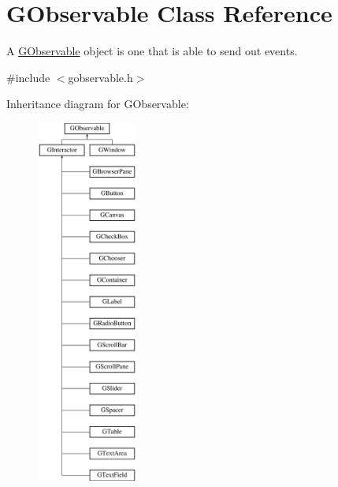 \hypertarget{classGObservable}{}\section{G\+Observable Class Reference}
\label{classGObservable}


A \mbox{\hyperlink{classGObservable}{G\+Observable}} object is one that is able to send out events.  




{\ttfamily \#include $<$gobservable.\+h$>$}

Inheritance diagram for G\+Observable\+:\begin{figure}[H]
\begin{center}
\leavevmode
\includegraphics[height=12.000000cm]{classGObservable}
\end{center}
\end{figure}
